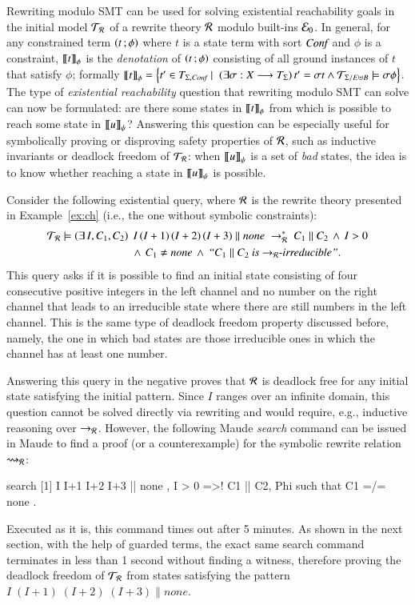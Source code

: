 Rewriting modulo SMT can be used %
for solving {%
  existential} reachability goals in the initial model $\mathcal{T}_{\mathcal{R}}$
of a rewrite theory $\mathcal{R}$ modulo built-ins $\mathcal{E}_{0}$. In
general, for any constrained term $\left( t \,; \phi \right)$ where $t$ is a
state term with sort $\textit{Conf}$ and $\phi$ is a constraint,
$\left\llbracket t \right\rrbracket_{\phi}$ is the \emph{denotation} of $\left( t \,; \phi \right)$
consisting of all ground instances of $t$ that satisfy $\phi$;
formally $\left\llbracket t \right\rrbracket_{\phi} = \left\{t' \in T_{\Sigma,\textit{Conf}} \mid \;
(\exists \sigma : X \longrightarrow T_\Sigma)\, t' = \sigma t \land
\mathcal{T}_{\Sigma/E\uplus B} \models \sigma\phi \right\}$.  The type of
\emph{existential reachability} question that rewriting modulo SMT can
solve can now be formulated: are there some states in $\left\llbracket t \right\rrbracket_{\phi}$
from which is possible to reach some state in $\left\llbracket u \right\rrbracket_{\psi}$?
Answering this question can be especially useful for symbolically
proving or disproving safety properties of $\mathcal{R}$, such as
 inductive invariants or deadlock freedom of $\mathcal{T}_{\mathcal{R}}$:
when $\left\llbracket u \right\rrbracket_{\psi}$ is a set of \emph{bad} states, the idea is to
know whether reaching a state in $\left\llbracket u \right\rrbracket_{\psi}$ is possible.

Consider the following existential query,
where  $\mathcal{R}$ is the rewrite theory presented 
in Example~\ref{ex:ch} (i.e., the one without symbolic constraints):
%
\begin{align*}
  \mathcal{T}_{\mathcal{R}} \models \left(\exists \,I,C_1,C_2 \right) \; & \,I \, (I+1) \, (I+2) \, (I+3) \parallel \textit{none} \;\rightarrow_{\mathcal{R}}^*\;C_1 \parallel C_2 \,\land\, I> 0 \\ & \land \, C_1 \neq \textit{none} \, \land \,  \textit{``$C_1 \parallel C_2$ is $\rightarrow_{\mathcal{R}}$-irreducible''}.
\end{align*}
%
This query asks if it is possible to find an initial state consisting
of four consecutive positive integers in the left channel and no
number on the right channel that leads to an irreducible state where
there are still numbers in the left channel.
%
This is the same type of
deadlock freedom property discussed before, namely, the one in which
bad states are those irreducible ones in which the channel has at least one number. 

Answering this query in the negative proves that
$\mathcal{R}$ is deadlock free for any initial state satisfying the initial
pattern. Since $I$ ranges over an infinite domain, this question
cannot be solved directly via rewriting and would require, e.g.,
inductive reasoning over $\rightarrow_{\mathcal{R}}$. 
However, the following Maude
\textit{search} command can be issued in Maude to find a proof (or a
counterexample) for the symbolic rewrite relation $\rightsquigarrow_{\mathcal{R}}$:
%
\begin{maude}
search [1] { I  I+1 I+2 I+3 || none , I > 0 }
       =>! { C1 || C2, Phi } such that C1 =/= none .
\end{maude}
%
Executed as it is, this command times out after 5 minutes.
As shown in
the next section, with the help of guarded terms, the exact same
search command terminates in less than 1 second without finding a
witness, therefore proving the deadlock freedom of $\mathcal{T}_{\mathcal{R}}$ from
states satisfying the pattern $I \; (I+1) \; (I+2) \; (I+3) \parallel
\textit{none}$.
